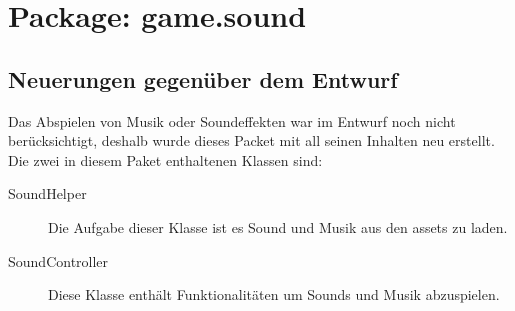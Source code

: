 \section{Package: game.sound}

\subsection{Neuerungen gegenüber dem Entwurf}

Das Abspielen von Musik oder Soundeffekten war im Entwurf noch nicht berücksichtigt, deshalb wurde dieses Packet mit all seinen Inhalten neu erstellt. Die zwei in diesem Paket enthaltenen Klassen sind:

\begin{description}
\item[SoundHelper]
Die Aufgabe dieser Klasse ist es Sound und Musik aus den assets zu laden.
\item[SoundController]
Diese Klasse enthält Funktionalitäten um Sounds und Musik abzuspielen.
\end{description}


